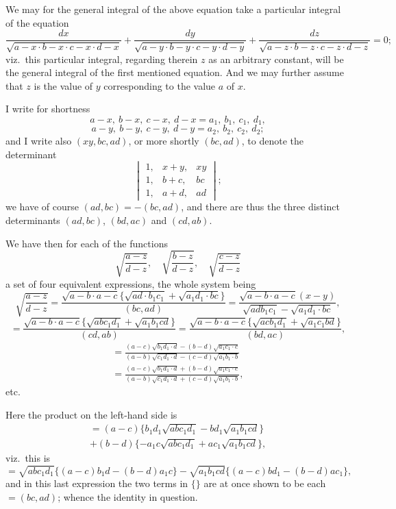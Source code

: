 \documentclass[11pt,a4paper]{article}
\begin{document}
We may for the general integral of the above equation take a particular integral of the equation
\[
\frac{dx}{\sqrt{a - x \cdot b - x \cdot c - x \cdot d - x}} + \frac{dy}{\sqrt{a - y \cdot b - y \cdot c - y \cdot d - y}} + \frac{dz}{\sqrt{a - z \cdot b - z \cdot c - z \cdot d - z}} = 0;
\]
viz.\ this particular integral, regarding therein $z$ as an arbitrary constant, will be the general integral of the first mentioned equation. And we may further assume that $z$ is the value of $y$ corresponding to the value $a$ of $x$.

I write for shortness
\[
a - x, \ b - x, \ c - x, \ d - x = a_1, \ b_1, \ c_1, \ d_1,
\]
\[
a - y, \ b - y, \ c - y, \ d - y = a_2, \ b_2, \ c_2, \ d_2;
\]
and I write also $(xy, bc, ad)$, or more shortly $(bc, ad)$, to denote the determinant
\[
\begin{vmatrix}
1, & x + y, & xy \\
1, & b + c, & bc \\
1, & a + d, & ad
\end{vmatrix};
\]
we have of course $(ad, bc) = -(bc, ad)$, and there are thus the three distinct determinants $(ad, bc)$, $(bd, ac)$ and $(cd, ab)$.

We have then for each of the functions
\[
\sqrt{\frac{a - z}{d - z}}, \quad \sqrt{\frac{b - z}{d - z}}, \quad \sqrt{\frac{c - z}{d - z}}
\]
a set of four equivalent expressions, the whole system being
\[
\sqrt{\frac{a - z}{d - z}} = \frac{\sqrt{a - b \cdot a - c}\{\sqrt{ad \cdot b_1c_1} + \sqrt{a_1d_1 \cdot bc}\}}{(bc, ad)} = \frac{\sqrt{a - b \cdot a - c}(x - y)}{\sqrt{adb_1c_1} - \sqrt{a_1d_1 \cdot bc}},
\]
\[
= \frac{\sqrt{a - b \cdot a - c}\{\sqrt{abc_1d_1} + \sqrt{a_1b_1cd}\}}{(cd, ab)} = \frac{\sqrt{a - b \cdot a - c}\{\sqrt{acb_1d_1} + \sqrt{a_1c_1bd}\}}{(bd, ac)},
\]
\begin{multline*}
= \frac{(a - c)\sqrt{b_1d_1 \cdot d} - (b - d)\sqrt{a_1c_1 \cdot c}}{(a - b)\sqrt{c_1d_1 \cdot d} - (c - d)\sqrt{a_1b_1 \cdot b}} \\
= \frac{(a - c)\sqrt{b_1d_1 \cdot d} + (b - d)\sqrt{a_1c_1 \cdot c}}{(a - b)\sqrt{c_1d_1 \cdot d} + (c - d)\sqrt{a_1b_1 \cdot b}},
\end{multline*}
etc.

\clearpage
Here the product on the left-hand side is
\begin{multline*}
= (a - c)\{b_1d_1\sqrt{abc_1d_1} - bd_1\sqrt{a_1b_1cd}\} \\
+ (b - d)\{-a_1c\sqrt{abc_1d_1} + ac_1\sqrt{a_1b_1cd}\},
\end{multline*}
viz.\ this is
\[
= \sqrt{abc_1d_1}\{(a - c)b_1d - (b - d)a_1c\} - \sqrt{a_1b_1cd}\{(a - c)bd_1 - (b - d)ac_1\},
\]
and in this last expression the two terms in $\{\}$ are at once shown to be each $= (bc, ad)$; whence the identity in question.
\end{document}
